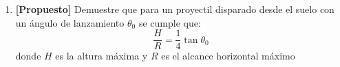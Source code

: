 \documentclass[letterpaper,11pt]{article}
\begin{document}
\begin{enumerate}
\begin{figure}[H]
    \centering
    \begin{subfigure}[t]{0.35\textwidth}
        \centering
        
        \caption{Figura P2}
    \end{subfigure}
    \hspace{1em}
    \begin{subfigure}[t]{0.35\textwidth}
        \centering
        
        \caption{Figura P3}
    \end{subfigure}
\end{figure}



\item \textbf{[Propuesto]} Demuestre que para un proyectil disparado desde el suelo con un ángulo de lanzamiento \(\theta_0\) se cumple que:
\[\frac{H}{R} = \frac{1}{4}\tan{\theta_0}\]
donde $H$ es la altura máxima y $R$ es el alcance horizontal máximo
%   

\end{enumerate}
\end{document}
